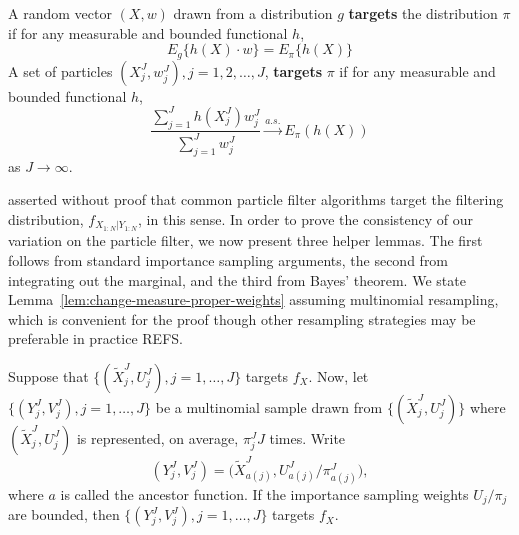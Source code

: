 \documentclass{article}
\begin{document}
\begin{defn}[Targeting]
    A random vector $(X, w)$ drawn from a distribution $g$ \textbf{targets} the distribution $\pi$ if for any measurable and bounded functional $h$,
\begin{equation}
    E_g\{h(X) \cdot w\}=E_\pi\{h(X)\}
\end{equation}  
    A set of particles $(X^J_j, w^J_j), j=1,2, \ldots,J$, \textbf{targets} $\pi$ if for any measurable and bounded functional $h$,
\begin{equation}
    \frac{\sum_{j=1}^J h(X^J_j) w^J_j}{\sum_{j=1}^J w^J_j} \stackrel{a.s.}{\to} E_\pi(h(X))
\end{equation}
as $J \to \infty$.
\end{defn}
\citet{chopin2004clt} asserted without proof that common particle filter algorithms target the filtering distribution, $f_{X_{1:N}|Y_{1:N}}$, in this sense.
In order to prove the consistency of our variation on the particle filter, we now present three helper lemmas.
The first follows from standard importance sampling arguments, the second from integrating out the marginal, and the third from Bayes' theorem. 
We state Lemma~\ref{lem:change-measure-proper-weights} assuming multinomial resampling, which is convenient for the proof though other resampling strategies may be preferable in practice REFS.

\begin{lem}
    \label{lem:change-measure-proper-weights}
    Suppose that $\{(\tilde X_j^J,U_j^J),j=1,\dots,J\}$ targets $f_X$. Now, let $\{(Y_j^J,V_j^J),j=1,\dots,J\}$ be a multinomial sample drawn from $\{(\tilde X_j^J,U_j^J)\}$ where $(\tilde X_j^J,U_j^J)$ is represented, on average, $\pi^J_j J$ times. Write
    \[
    (Y_j^J,V_j^J) = \big(\tilde X^J_{a(j)},U^J_{a(j)}/\pi^J_{a(j)}\big),
    \]
    where $a$ is called the ancestor function. If the importance sampling weights $U_j/\pi_j$ are bounded, then $\{(Y^J_j,V^J_j),j=1,\dots,J\}$ targets $f_X$.
\end{lem}
\end{document}
